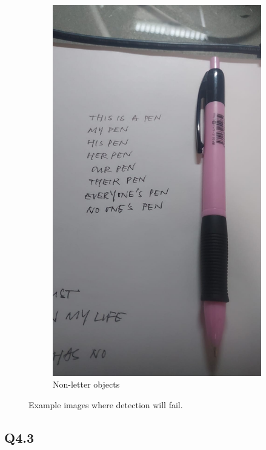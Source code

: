 \documentclass{article} %
\begin{document}
\begin{figure}[H]
\begin{subfigure}[b]{0.49\textwidth}
            \includegraphics[height=0.3\textheight,width=\textwidth,keepaspectratio=true]{4,1 img1.jpeg}
            \caption{Non-letter objects}
        \end{subfigure}
        \caption{Example images where detection will fail.}
        \label{q41}
    \end{figure}
    
    \subsection*{Q4.3}
\end{document}
